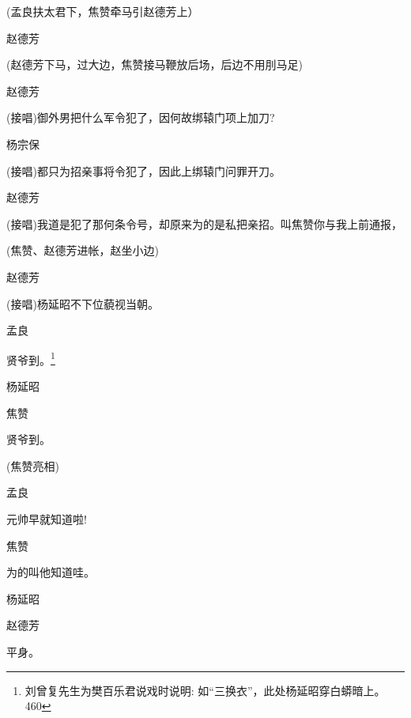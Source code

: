 {(孟良扶太君下，焦赞牵马引赵德芳上）

赵德芳\hspace{20pt}~


(赵德芳下马，过大边，焦赞接马鞭放后场，后边不用刖马足)

赵德芳\hspace{20pt}~

(接唱)御外男把什么军令犯了，因何故绑辕门项上加刀?

杨宗保\hspace{20pt}~

(接唱)都只为招亲事将令犯了，因此上绑辕门问罪开刀。

赵德芳

(接唱)我道是犯了那何条令号，却原来为的是私把亲招。叫焦赞你与我上前通报，

(焦赞、赵德芳进帐，赵坐小边)

赵德芳\hspace{20pt}~

(接唱)杨延昭不下位藐视当朝。

孟良\hspace{30pt}~

贤爷到。\footnote{

刘曾复先生为樊百乐君说戏时说明: 如``三换衣''，此处杨延昭穿白蟒暗上。{460}}

杨延昭\hspace{20pt}~


焦赞\hspace{30pt}~

贤爷到。

(焦赞亮相)

孟良\hspace{30pt}~

元帅早就知道啦!

焦赞\hspace{30pt}~

为的叫他知道哇。

杨延昭


赵德芳\hspace{20pt}~

平身。

}
